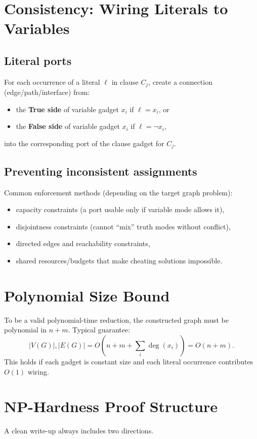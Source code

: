 \documentclass[11pt]{article}
\begin{document}
\section{Consistency: Wiring Literals to Variables}
\subsection{Literal ports}
For each occurrence of a literal $\ell$ in clause $C_j$, create a connection (edge/path/interface) from:
\begin{itemize}[itemsep=2pt]
  \item the \textbf{True side} of variable gadget $x_i$ if $\ell=x_i$, or
  \item the \textbf{False side} of variable gadget $x_i$ if $\ell=\neg x_i$,
\end{itemize}
into the corresponding port of the clause gadget for $C_j$.

\subsection{Preventing inconsistent assignments}
Common enforcement methods (depending on the target graph problem):
\begin{itemize}[itemsep=2pt]
  \item capacity constraints (a port usable only if variable mode allows it),
  \item disjointness constraints (cannot ``mix'' truth modes without conflict),
  \item directed edges and reachability constraints,
  \item shared resources/budgets that make cheating solutions impossible.
\end{itemize}

\section{Polynomial Size Bound}
To be a valid polynomial-time reduction, the constructed graph must be polynomial in $n+m$.
Typical guarantee:
\[
|V(G)|, |E(G)| = O\!\left(n + m + \sum_i \deg(x_i)\right) = O(n+m).
\]
This holds if each gadget is constant size and each literal occurrence contributes $O(1)$ wiring.

\section{NP-Hardness Proof Structure}
A clean write-up always includes two directions.
\end{document}
